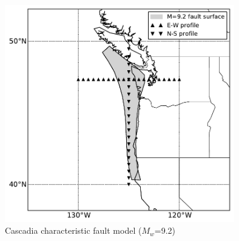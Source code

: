 \begin{figure}
\centering
\includegraphics[width=10cm]{./qareport/pictures/cascadia_char.pdf}
\caption{Cascadia characteristic fault model ($M_{w}$=9.2)}
\label{fig:cascadia_geo}
\end{figure}

